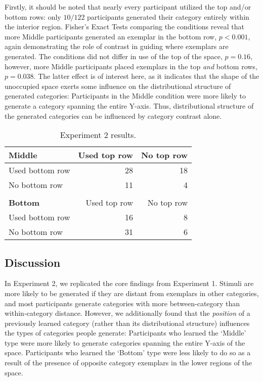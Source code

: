 \documentclass[12pt]{article}
\begin{document}
\begin{flushleft}
Firstly, it should be noted that nearly every participant utilized the top and/or bottom rows: only $10 / 122$ participants generated their category entirely within the interior region. Fisher's Exact Tests comparing the conditions reveal that more Middle participants generated an exemplar in the bottom row, $p < 0.001$, again demonstrating the role of contrast in guiding where exemplars are generated. The conditions did not differ in use of the top of the space, $p = 0.16$, however, more Middle participants placed exemplars in the top {\em and} bottom rows, $p = 0.038$. The latter effect is of interest here, as it indicates that the shape of the unoccupied space exerts some influence on the distributional structure of generated categories: Participants in the Middle condition were more likely to generate a category spanning the entire Y-axis. Thus, distributional structure of the generated categories can be influenced by category contrast alone.

\begin{table}
\begin{center} 
\caption{Experiment 2 results.} 
\label{table:e2-subset-table} 
\vskip 0.12in
\begin{tabular}{ l r r}
    \textbf{Middle}         & Used top row & No top row \\
    \hline
    Used bottom row       &  28 & 18  \\
    No bottom row          &  11 &  4  \\
    \\
    \textbf{Bottom}         & Used top row & No top row \\
    \hline
    Used bottom row        & 16 & 8 \\
    No bottom row          & 31 & 6 \\
\end{tabular}
\end{center} 
\end{table}

\subsection{Discussion}

In Experiment 2, we replicated the core findings from Experiment 1. Stimuli are more likely to be generated if they are distant from exemplars in other categories, and most participants generate categories with more between-category than within-category distance. However, we additionally found that the {\em position} of a previously learned category (rather than its distributional structure) influences the types of categories people generate: Participants who learned the `Middle' type were more likely to generate categories spanning the entire Y-axis of the space. Participants who learned the `Bottom' type were less likely to do so as a result of the presence of opposite category exemplars in the lower regions of the space.


\end{flushleft}
\end{document}
